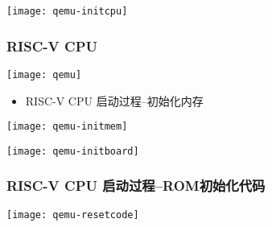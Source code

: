 \begin{frame}
%		
%		
	\centering
	\texttt{[image: qemu-initcpu]}
\end{frame}

\begin{frame}
	\frametitle{RISC-V CPU}
	\texttt{[image: qemu]}	
	\begin{itemize}
		
		\item RISC-V CPU 启动过程--初始化内存
		
	\end{itemize}	
	
	\centering
	\texttt{[image: qemu-initmem]}
\end{frame}

\begin{frame}[plain]
%		
%		
	\centering
	\texttt{[image: qemu-initboard]}
\end{frame}


\begin{frame}
	\frametitle{RISC-V CPU 启动过程--ROM初始化代码}
%		
%		
	
	\centering
	\texttt{[image: qemu-resetcode]}
\end{frame}




